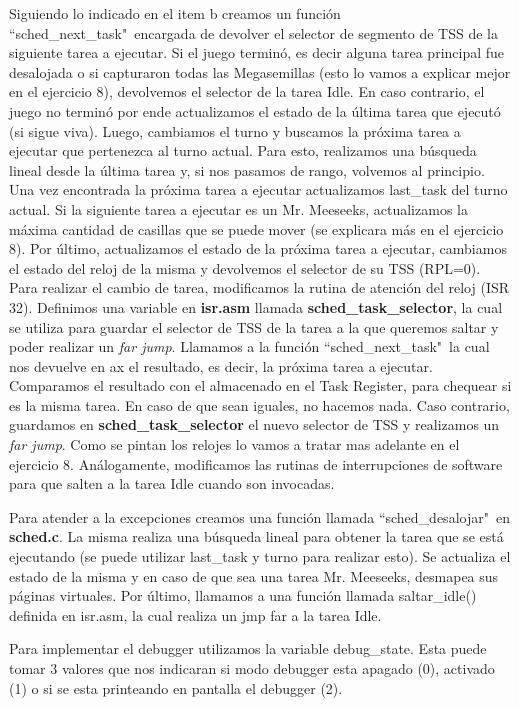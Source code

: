 \documentclass[a4paper]{article}
\begin{document}
\justify
Siguiendo lo indicado en el item b creamos un función ``sched_next_task"\ encargada de devolver el selector de segmento de TSS de la siguiente tarea a ejecutar. Si el juego terminó, es decir alguna tarea principal fue desalojada o si capturaron todas las Megasemillas (esto lo vamos a explicar mejor en el ejercicio $8$), devolvemos el selector de la tarea Idle. En caso contrario, el juego no terminó por ende actualizamos el estado de la última tarea que ejecutó (si sigue viva). Luego, cambiamos el turno y buscamos la próxima tarea a ejecutar que pertenezca al turno actual. Para esto, realizamos una búsqueda lineal desde la última tarea y, si nos pasamos de rango, volvemos al principio. Una vez encontrada la próxima tarea a ejecutar actualizamos last_task del turno actual. Si la siguiente tarea a ejecutar es un Mr. Meeseeks, actualizamos la máxima cantidad de casillas que se puede mover (se explicara más en el ejercicio $8$). Por último, actualizamos el estado de la próxima tarea a ejecutar, cambiamos el estado del reloj de la misma y devolvemos el selector de su TSS (RPL=0).
\justify
Para realizar el cambio de tarea, modificamos la rutina de atención del reloj (ISR 32). Definimos una variable en \textbf{isr.asm} llamada \textbf{sched_task_selector}, la cual se utiliza para guardar el selector de TSS de la tarea a la que queremos saltar y poder realizar un \textit{far jump}. Llamamos a la función ``sched_next_task"\ la cual nos devuelve en ax el resultado, es decir, la próxima tarea a ejecutar. Comparamos el resultado con el almacenado en el Task Register, para chequear si es la misma tarea. En caso de que sean iguales, no hacemos nada. Caso contrario, guardamos en \textbf{sched_task_selector} el nuevo selector de TSS y realizamos un \textit{far jump}. Como se pintan los relojes lo vamos a tratar mas adelante en el ejercicio $8$.
\justify
Análogamente, modificamos las rutinas de interrupciones de software para que salten a la tarea Idle cuando son invocadas.

\justify
Para atender a la excepciones creamos una función llamada ``sched_desalojar"\ en \textbf{sched.c}. La misma realiza una búsqueda lineal para obtener la tarea que se está ejecutando (se puede utilizar last_task y turno para realizar esto). Se actualiza el estado de la misma y en caso de que sea una tarea Mr. Meeseeks, desmapea sus páginas virtuales. Por último, llamamos a una función llamada saltar_idle() definida en isr.asm, la cual realiza un jmp far a la tarea Idle.


\justify
Para implementar el debugger utilizamos la variable debug_state. Esta puede tomar $3$ valores que nos indicaran si modo debugger esta apagado (0), activado (1) o si se esta printeando en pantalla el debugger (2).
\end{document}
